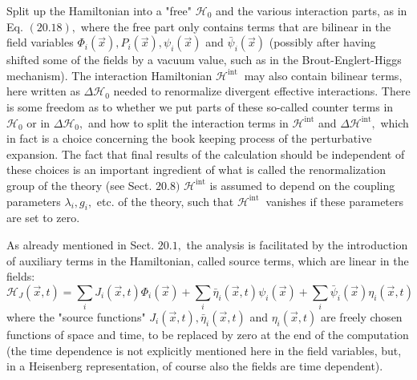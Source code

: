 \documentclass[main.tex]{subfiles}
\begin{document}
Split up the Hamiltonian into a "free" $\mathcal{H}_{0}$ and the various interaction parts, as in Eq. $(20.18),$ where the free part only contains terms that are bilinear in the field variables $\Phi_{i}(\vec{x}), P_{i}(\vec{x}), \psi_{i}(\vec{x})$ and $\bar{\psi}_{i}(\vec{x})$ (possibly after having shifted some of the fields by a vacuum value, such as in the Brout-Englert-Higgs mechanism). The interaction Hamiltonian $\mathcal{H}^{\text {int }}$ may also contain bilinear terms, here written as $\Delta \mathcal{H}_{0}$ needed to renormalize divergent effective interactions. There is some freedom as to whether we put parts of these so-called counter terms in $\mathcal{H}_{0}$ or in $\Delta \mathcal{H}_{0},$ and how to split the interaction terms in $\mathcal{H}^{\mathrm{int}}$ and $\Delta \mathcal{H}^{\mathrm{int}},$ which in fact is a choice concerning the book keeping process of the perturbative expansion. The fact that final results of the calculation should be independent of these choices is an important ingredient of what is called the renormalization group of the theory (see Sect. $20.8)$ $\mathcal{H}^{\mathrm{int}}$ is assumed to depend on the coupling parameters $\lambda_{i}, g_{i},$ etc. of the theory, such that $\mathcal{H}^{\text {int }}$ vanishes if these parameters are set to zero.

As already mentioned in Sect. $20.1,$ the analysis is facilitated by the introduction of auxiliary terms in the Hamiltonian, called source terms, which are linear in the fields:
$$
\mathcal{H}_{J}(\vec{x}, t)=\sum_{i} J_{i}(\vec{x}, t) \Phi_{i}(\vec{x})+\sum_{i} \bar{\eta}_{i}(\vec{x}, t) \psi_{i}(\vec{x})+\sum_{i} \bar{\psi}_{i}(\vec{x}) \eta_{i}(\vec{x}, t)
$$
where the "source functions" $J_{i}(\vec{x}, t), \bar{\eta}_{i}(\vec{x}, t)$ and $\eta_{i}(\vec{x}, t)$ are freely chosen functions of space and time, to be replaced by zero at the end of the computation (the time dependence is not explicitly mentioned here in the field variables, but, in a Heisenberg representation, of course also the fields are time dependent).
\end{document}
